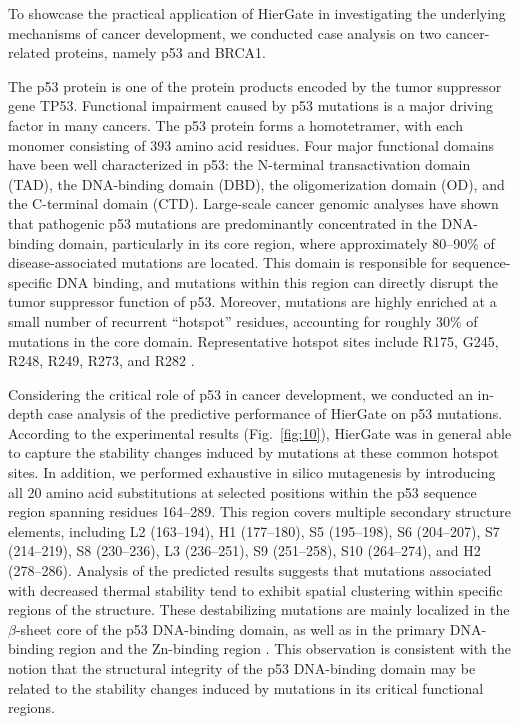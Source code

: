\documentclass[journal,twoside,web]{ieeecolor}
\begin{document}
To showcase the practical application of HierGate in investigating the underlying mechanisms of cancer development, we conducted case analysis on two cancer-related proteins, namely p53 and BRCA1.

The p53 protein is one of the protein products encoded by the tumor suppressor gene TP53. Functional impairment caused by p53 mutations is a major driving factor in many cancers. The p53 protein forms a homotetramer, with each monomer consisting of 393 amino acid residues. Four major functional domains have been well characterized in p53: the N-terminal transactivation domain (TAD), the DNA-binding domain (DBD), the oligomerization domain (OD), and the C-terminal domain (CTD). Large-scale cancer genomic analyses have shown that pathogenic p53 mutations are predominantly concentrated in the DNA-binding domain, particularly in its core region, where approximately 80--90\% of disease-associated mutations are located. This domain is responsible for sequence-specific DNA binding, and mutations within this region can directly disrupt the tumor suppressor function of p53. Moreover, mutations are highly enriched at a small number of recurrent ``hotspot'' residues, accounting for roughly 30\% of mutations in the core domain. Representative hotspot sites include R175, G245, R248, R249, R273, and R282 \cite{Cho1994}.

Considering the critical role of p53 in cancer development, we conducted an in-depth case analysis of the predictive performance of HierGate on p53 mutations. According to the experimental results (Fig.~\ref{fig:10}), HierGate was in general able to capture the stability changes induced by mutations at these common hotspot sites. In addition, we performed exhaustive in silico mutagenesis by introducing all 20 amino acid substitutions at selected positions within the p53 sequence region spanning residues 164--289. This region covers multiple secondary structure elements, including L2 (163--194), H1 (177--180), S5 (195--198), S6 (204--207), S7 (214--219), S8 (230--236), L3 (236--251), S9 (251--258), S10 (264--274), and H2 (278--286). Analysis of the predicted results suggests that mutations associated with decreased thermal stability tend to exhibit spatial clustering within specific regions of the structure. These destabilizing mutations are mainly localized in the $\beta$-sheet core of the p53 DNA-binding domain, as well as in the primary DNA-binding region and the Zn-binding region \cite{Cho1994}. This observation is consistent with the notion that the structural integrity of the p53 DNA-binding domain may be related to the stability changes induced by mutations in its critical functional regions.
\end{document}
